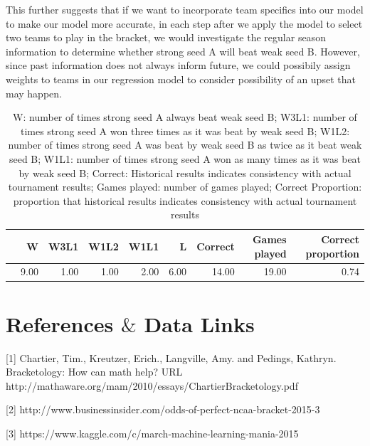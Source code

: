 \documentclass{article} %
\begin{document}
This further suggests that if we want to incorporate team specifics into our model to make our model more accurate, in each step after we apply the model to select two teams to play in the bracket, we would investigate the regular season information to determine whether strong seed A will beat weak seed B. However, since past information does not always inform future, we could possibily assign weights to teams in our regression model to consider possibility of an upset that may happen. 


\begin{table}[ht]
\centering
\begin{tabular}{rrrrrrrrr}
\hline
& W & W3L1 & W1L2 & W1L1 & L & Correct & Games played & Correct proportion \\ 
\hline
& 9.00 & 1.00 & 1.00 & 2.00 & 6.00 & 14.00 & 19.00 & 0.74 \\ 
\hline
\end{tabular}

\caption{W: number of times strong seed A always beat weak seed B; W3L1: number of times strong seed A won three times as it was beat by weak seed B; W1L2: number of times strong seed A was beat by weak seed B as twice as it beat weak seed B; W1L1: number of times strong seed A won as many times as it was beat by weak seed B; Correct: Historical results indicates consistency with actual tournament results; Games played: number of games played; Correct Proportion: proportion that historical results indicates consistency with actual tournament results}
\end{table}




\newpage
\section{References $\&$ Data Links}
[1] Chartier, Tim., Kreutzer, Erich., Langville,  Amy. and Pedings, Kathryn. Bracketology: How can math help? URL http://mathaware.org/mam/2010/essays/ChartierBracketology.pdf

[2] http://www.businessinsider.com/odds-of-perfect-ncaa-bracket-2015-3

[3] https://www.kaggle.com/c/march-machine-learning-mania-2015





\newpage
\end{document}
